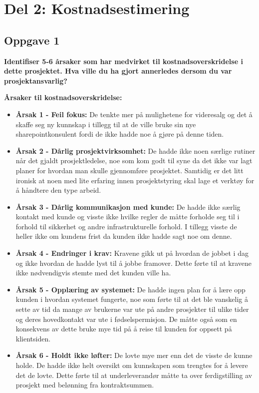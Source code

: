 \section*{Del 2: Kostnadsestimering}

	\subsection*{Oppgave 1}
		{\bf Identifiser 5-6 årsaker som har medvirket til kostnadsoverskridelse
		i dette prosjektet. Hva ville du ha gjort annerledes dersom du var prosjektansvarlig?}

		{\bf Årsaker til kostnadsoverskridelse:}
		\begin{itemize}
			\item {\bf Årsak 1 - Feil fokus:} De tenkte mer på mulighetene for videresalg og 
			det å skaffe seg ny kunnskap i tillegg til at de ville bruke sin nye sharepointkonsulent 
			fordi de ikke hadde noe å gjøre på denne tiden.
			\item {\bf Årsak 2 - Dårlig prosjektvirksomhet:} De hadde ikke noen særlige rutiner når det 
			gjaldt prosjektledelse, noe som kom godt til syne da det ikke var lagt planer for hvordan 
			man skulle gjennomføre prosjektet. Samtidig er det litt ironisk at noen med lite erfaring
			innen prosjektstyring skal lage et verktøy for å håndtere den type arbeid. 
			\item {\bf Årsak 3 - Dårlig kommunikasjon med kunde:} De hadde ikke særlig kontakt med kunde og 
			visste ikke hvilke regler de måtte forholde seg til i forhold til sikkerhet og andre 
			infrastrukturelle forhold. I tillegg visste de heller ikke om kundens frist da kunden 
			ikke hadde sagt noe om denne.
			\item {\bf Årsak 4 - Endringer i krav:} Kravene gikk ut på hvordan de jobbet i dag og 
			ikke hvordan de hadde lyst til å jobbe framover. Dette førte til at kravene ikke 
			nødvendigvis stemte med det kunden ville ha.
			\item {\bf Årsak 5 - Opplæring av systemet:} De hadde ingen plan for å lære opp kunden i 
			hvordan systemet fungerte, noe som førte til at det ble vanskelig å sette av tid da 
			mange av brukerne var ute på andre prosjekter til ulike tider og deres hovedkontakt 
			var ute i fødselspermisjon. De måtte også som en konsekvens av dette bruke mye tid på å
			reise til kunden for oppsett på klientsiden. 
			\item {\bf Årsak 6 - Holdt ikke løfter:} De lovte mye mer enn det de visste de kunne holde. 
			De hadde ikke helt oversikt om kunnskapen som trengtes for å levere det de lovte.
			Dette førte til at underleverandør måtte ta over ferdigstilling av prosjekt med belønning fra
			kontraktsummen. 
		\end{itemize}

